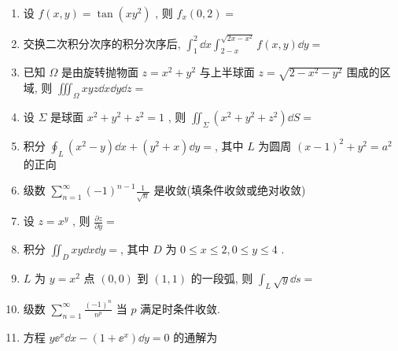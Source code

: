 \begin{enumerate}
	\item 设 $f(x, y)=\tan \left(x y^{2}\right)$ , 则 $f_{x}(0,2)=$\underline{\hspace{8pc}}
	
	\item  交换二次积分次序的积分次序后, $\int_{1}^{2} \dd x \int_{2-x}^{\sqrt{2 x-x^{2}}} f(x, y) \dd y=$\underline{\hspace{8pc}}
	
	\item  已知 $\Omega$ 是由旋转抛物面 $z=x^{2}+y^{2}$ 与上半球面 $z=\sqrt{2-x^{2}-y^{2}}$ 围成的区域, 则 $\iiint_{\Omega} x y z \dd x \dd y \dd z=$\underline{\hspace{8pc}}
	
	\item  设 $\Sigma$ 是球面 $x^{2}+y^{2}+z^{2}=1$ , 则 $\iint_{\Sigma}\left(x^{2}+y^{2}+z^{2}\right) \dd S=$\underline{\hspace{8pc}}
	
	\item 积分 $\oint_{L}\left(x^{2}-y\right) \dd x+\left(y^{2}+x\right) \dd y=$\underline{\hspace{8pc}}, 其中 $L$ 为圆周 $(x-1)^{2}+y^{2}=a^{2}$ 的正向
	
	\item 级数 $\sum_{n=1}^{\infty}(-1)^{n-1} \frac{1}{\sqrt{n}}$ 是\underline{\hspace{8pc}}收敛(填条件收敛或绝对收敛)
	
	\item 设 $z=x^{y}$ , 则 $\frac{\partial z}{\partial y}=$\underline{\hspace{8pc}}
	
	\item 积分 $\iint_{D} x y \dd x \dd y=$\underline{\hspace{8pc}}, 其中 $D$ 为 $0 \leq x \leq 2, 0 \leq y \leq 4$ .
	
	\item $L$ 为 $y=x^2$ 点 $(0,0)$ 到 $(1,1)$ 的一段弧, 则 $\int_{L} \sqrt{y} \dd s=$\underline{\hspace{8pc}}
	
	\item 级数 $\sum_{n=1}^{\infty} \frac{(-1)^{n}}{n^{p}}$ 当 $p$ 满足\underline{\hspace{8pc}}时条件收敛.
	
	\item 方程 $y \ee^{x} \dd x-\left(1+\ee^{x}\right) \dd y=0$ 的通解为\underline{\hspace{8pc}}
	

\end{enumerate}
